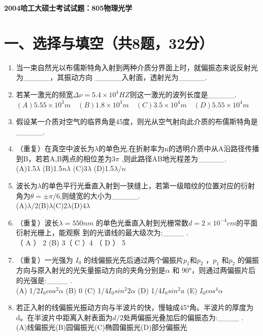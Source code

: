\documentclass[12pt, a4paper]{article}
\theoremstyle{solution}
\begin{document}
\begin{center}
\Large\textbf{2004哈工大硕士考试试题：805物理光学}
\end{center}




\section*{一、选择与填空（共8题，32分）}
\begin{enumerate}
    \item 当一束自然光以布儒斯特角入射到两种介质分界面上时，就偏振态来说反射光为\_\_\_\_\_，其振动方向 \_\_\_\_\_入射面，透射光为\_\_\_\_\_.
    \item 若某一激光的频宽\(\Delta \nu=5.4×10^4HZ\)则这一激光的波列长度是\_\_\_\_\_.\\$(A)5.55×10^3m \quad (B)1.8×10^3m \quad (C)3.5×10^4m \quad (D)5.55×10^4m$
    \item 假设某一介质对空气的临界角是45度，则光从空气射向此介质的布儒斯特角是\_\_\_\_\_.
    \item（重复）在真空中波长为\(\lambda\)的单色光,在折射率为n的透明介质中从A沿路径传播到B，若若A,B两点的相位差为3\(\pi\) ,则此路径AB地光程差为\_\_\_\_\_.\\(A)1.5\(\lambda\) \qquad(B)1.5\(n\lambda\) \qquad(C)3\(\lambda\) \qquad(D)1.5\(\lambda/n\)
    \item 波长为\(\lambda\)的单色平行光垂直入射到一狭缝上，若第一级暗纹的位置对应的衍射角为$\theta=±\pi/6$,则缝宽的大小为\_\_\_\_\_.\\(A)\(\lambda/2\)\qquad(B)\(\lambda\)\qquad(C)\(2\lambda\)\qquad(D)\(4\lambda\)
    \item （重复）波长\(\lambda=550nm\) 的单⾊光垂直⼊射到光栅常数\(d=2×1 0^{-4}cm\)的平面衍射光栅上，能观察 到的光谱线的最⼤级次为:\_\_\_\_ .\\（ A ） 2  \qquad (B)  3\qquad  （ C ）4 \qquad （ D ） 5
    \item （重复）⼀光强为 \(I_0\) 的线偏振光先后通过两个偏振⽚\(p_1\)和\(p_2\) ，\(p_1\) 和\(p_2\) 的偏振⽅向与原⼊射光的光矢量振动⽅向的夹角分别是\(\alpha\) 和 \(90°\)，则通过两偏振⽚后的光强是:\_\_\_\_ .\\(A) 1/2\(I_0 cos^2\alpha\)  \quad(B) 0  \quad(C) 1/4\(I_0 sin^2 2\alpha\)  \quad(D) 1/4\(I_0sin^2a\) \quad (E) \(I_0cos^4 \alpha\)
    \item 若正入射的线偏振光振动方向与半波片的快，慢轴成45°角。半波片的厚度为d。在半波片中距离入射表面为\(d/2\)处两偏振光叠加后的偏振态为:\_\_\_\_ .\\(A)线偏振光\quad (B)园偏振光\quad (C)椭圆偏振光\quad (D)部分偏振光
\end{enumerate}
\end{document}
